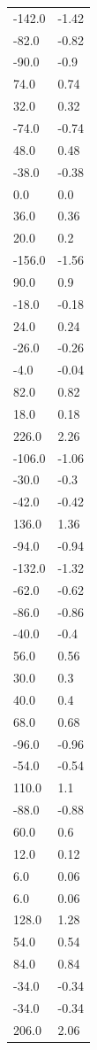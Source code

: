 \begin{longtable}{ll}
-142.0 & -1.42 \\
-82.0 & -0.82 \\
-90.0 & -0.9 \\
74.0 & 0.74 \\
32.0 & 0.32 \\
-74.0 & -0.74 \\
48.0 & 0.48 \\
-38.0 & -0.38 \\
0.0 & 0.0 \\
36.0 & 0.36 \\
20.0 & 0.2 \\
-156.0 & -1.56 \\
90.0 & 0.9 \\
-18.0 & -0.18 \\
24.0 & 0.24 \\
-26.0 & -0.26 \\
-4.0 & -0.04 \\
82.0 & 0.82 \\
18.0 & 0.18 \\
226.0 & 2.26 \\
-106.0 & -1.06 \\
-30.0 & -0.3 \\
-42.0 & -0.42 \\
136.0 & 1.36 \\
-94.0 & -0.94 \\
-132.0 & -1.32 \\
-62.0 & -0.62 \\
-86.0 & -0.86 \\
-40.0 & -0.4 \\
56.0 & 0.56 \\
30.0 & 0.3 \\
40.0 & 0.4 \\
68.0 & 0.68 \\
-96.0 & -0.96 \\
-54.0 & -0.54 \\
110.0 & 1.1 \\
-88.0 & -0.88 \\
60.0 & 0.6 \\
12.0 & 0.12 \\
6.0 & 0.06 \\
6.0 & 0.06 \\
128.0 & 1.28 \\
54.0 & 0.54 \\
84.0 & 0.84 \\
-34.0 & -0.34 \\
-34.0 & -0.34 \\
206.0 & 2.06 \\

\end{longtable}
